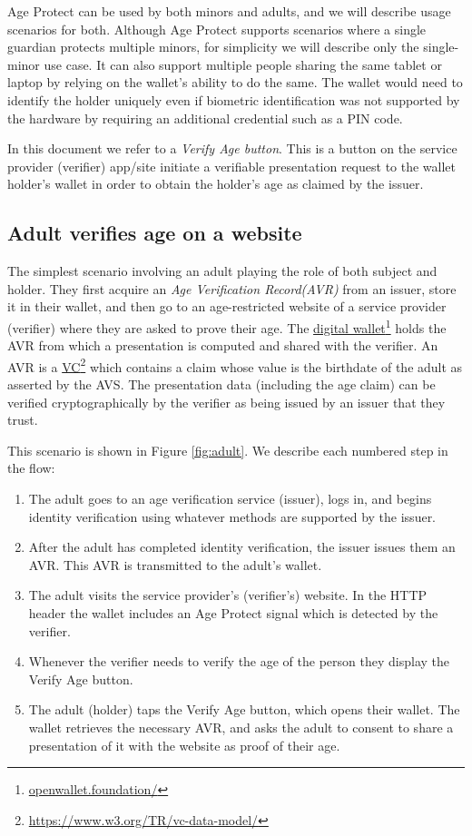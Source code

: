 \documentclass[11pt, oneside]{article}   	%
\newcommand{\hyperfootnote}[1][]{\def\ArgI{{#1}}\hyperfootnoteRelay}
\newcommand\hyperfootnoteRelay[2][]{\href{#1#2}{\ArgI}\footnote{\href{#1#2}{#2}}}
\begin{document}
Age Protect can be used by both minors and adults, and we will describe usage scenarios for both. Although Age Protect supports scenarios where a single guardian protects multiple minors, for simplicity we will describe only the single-minor use case. It can also support multiple people sharing the same tablet or laptop by relying on the wallet's ability to do the same. The wallet would need to identify the holder uniquely even if biometric identification was not supported by the hardware by requiring an additional credential such as a PIN code.

In this document we refer to a \emph{Verify Age button}. This is a button on the service provider (verifier) app/site initiate a verifiable presentation request to the wallet holder's wallet in order to obtain the holder's age as claimed by the issuer.

\subsection{Adult verifies age on a website}

The simplest scenario involving an adult playing the role of both subject and holder. They first acquire an \emph{Age Verification Record(AVR)} from an issuer, store it in their wallet, and then go to an age-restricted website of a service provider (verifier) where they are asked to prove their age. The \hyperfootnote[digital wallet][https://]{openwallet.foundation/} holds the AVR from which a presentation is computed and shared with the verifier. An AVR is a \hyperfootnote[VC][https://]{https://www.w3.org/TR/vc-data-model/} which contains a claim whose value is the birthdate of the adult as asserted by the AVS. The presentation data (including the age claim) can be verified cryptographically by the verifier as being issued by an issuer that they trust.

This scenario is shown in Figure \ref{fig:adult}. We describe each numbered step in the flow: 

\begin{enumerate}
	\item The adult goes to an age verification service (issuer), logs in, and begins identity verification using whatever methods are supported by the issuer. 
	\item After the adult has completed identity verification, the issuer issues them an AVR. This AVR is transmitted to the adult's wallet.
	\item The adult visits the service provider's (verifier's) website. In the HTTP header the wallet includes an Age Protect signal which is detected by the verifier. 
	\item Whenever the verifier needs to verify the age of the person they display the Verify Age button.
	\item The adult (holder) taps the Verify Age button, which opens their wallet. The wallet retrieves the necessary AVR, and asks the adult to consent to share a presentation of it with the website as proof of their age. 
\end{enumerate}
\end{document}
